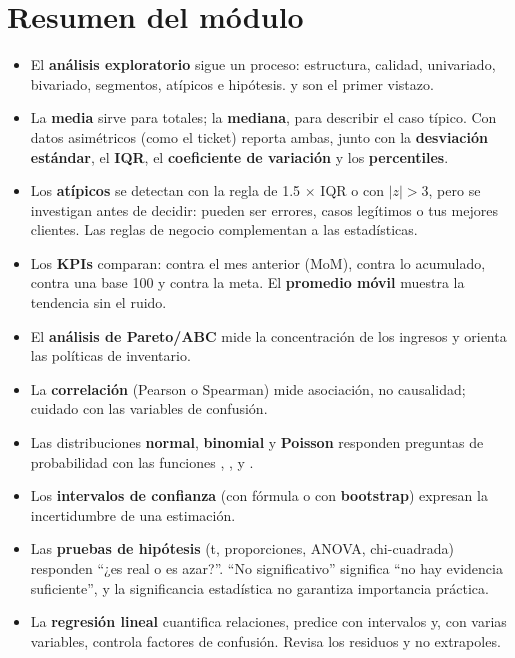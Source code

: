 \section{Resumen del módulo}
\label{sec:m4-resumen}

\begin{resumen}
\begin{itemize}
  \item El \textbf{análisis exploratorio} sigue un proceso: estructura,
        calidad, univariado, bivariado, segmentos, atípicos e hipótesis.
         y  son el primer vistazo.
  \item La \textbf{media} sirve para totales; la \textbf{mediana}, para
        describir el caso típico. Con datos asimétricos (como el ticket)
        reporta ambas, junto con la \textbf{desviación estándar}, el
        \textbf{IQR}, el \textbf{coeficiente de variación} y los
        \textbf{percentiles}.
  \item Los \textbf{atípicos} se detectan con la regla de 1.5 $\times$ IQR o
        con $|z| > 3$, pero se investigan antes de decidir: pueden ser
        errores, casos legítimos o tus mejores clientes. Las reglas de negocio
        complementan a las estadísticas.
  \item Los \textbf{KPIs} comparan: contra el mes anterior (MoM), contra lo
        acumulado, contra una base 100 y contra la meta. El
        \textbf{promedio móvil} muestra la tendencia sin el ruido.
  \item El \textbf{análisis de Pareto/ABC} mide la concentración de los
        ingresos y orienta las políticas de inventario.
  \item La \textbf{correlación} (Pearson o Spearman) mide asociación, no
        causalidad; cuidado con las variables de confusión.
  \item Las distribuciones \textbf{normal}, \textbf{binomial} y
        \textbf{Poisson} responden preguntas de probabilidad con las
        funciones , ,  y .
  \item Los \textbf{intervalos de confianza} (con fórmula o con
        \textbf{bootstrap}) expresan la incertidumbre de una estimación.
  \item Las \textbf{pruebas de hipótesis} (t, proporciones, ANOVA,
        chi-cuadrada) responden ``¿es real o es azar?''. ``No significativo''
        significa ``no hay evidencia suficiente'', y la significancia
        estadística no garantiza importancia práctica.
  \item La \textbf{regresión lineal} cuantifica relaciones, predice con
        intervalos y, con varias variables, controla factores de confusión.
        Revisa los residuos y no extrapoles.
\end{itemize}
\end{resumen}

